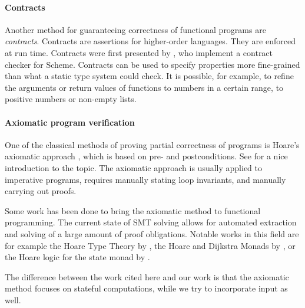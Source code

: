 \paragraph{Contracts}
Another method for guaranteeing correctness of functional programs are \emph{contracts}.
Contracts are assertions for higher-order languages.
They are enforced at run time.
Contracts were first presented by \citet{FindlerF2002}, who implement a contract checker for Scheme.
Contracts can be used to specify properties more fine-grained than what a static type system could check.
It is possible, for example, to refine the arguments or return values of functions to numbers in a certain range, to positive numbers or non-empty lists.


\paragraph{Axiomatic program verification}
One of the classical methods of proving partial correctness of programs is Hoare's axiomatic approach \cite{Hoare1969}, which is based on pre- and postconditions.
See \citet{NielsonN1992} for a nice introduction to the topic.
The axiomatic approach is usually applied to imperative programs, requires manually stating loop invariants, and manually carrying out proofs.

Some work has been done to bring the axiomatic method to functional programming.
The current state of SMT solving allows for automated extraction and solving of a large amount of proof obligations.
Notable works in this field are for example the Hoare Type Theory by \citet{NanevskiMB2006}, the Hoare and Dijkstra Monads by \citet{NanevskiMSGB08, SwamyWSCL2013}, or the Hoare logic for the state monad by \citet{Swierstra2009}.

The difference between the work cited here and our work is that the axiomatic method focuses on stateful computations, while we try to incorporate input as well.
